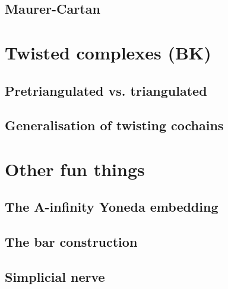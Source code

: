 \documentclass{beamer}
\begin{document}
        \subsection{Maurer-Cartan}


    \section{Twisted complexes (BK)}
        
        \subsection{Pretriangulated vs. triangulated}
        
        \subsection{Generalisation of twisting cochains}
    

    \section{Other fun things}

        \subsection{The A-infinity Yoneda embedding}
        
        \subsection{The bar construction}
        
        \subsection{Simplicial nerve}
\end{document}
